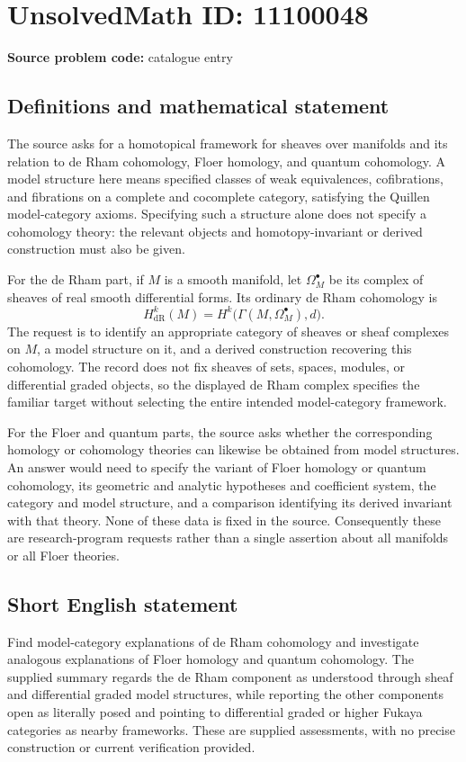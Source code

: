 \documentclass[11pt]{article}
\begin{document}
\section*{UnsolvedMath ID: 11100048}
\textbf{Source problem code:} catalogue entry
\subsection{Definitions and mathematical statement}
The source asks for a homotopical framework for sheaves over manifolds and its relation to de Rham cohomology, Floer homology, and quantum cohomology. A model structure here means specified classes of weak equivalences, cofibrations, and fibrations on a complete and cocomplete category, satisfying the Quillen model-category axioms. Specifying such a structure alone does not specify a cohomology theory: the relevant objects and homotopy-invariant or derived construction must also be given.

For the de Rham part, if $M$ is a smooth manifold, let $\Omega_M^{\bullet}$ be its complex of sheaves of real smooth differential forms. Its ordinary de Rham cohomology is
\[
 H^k_{\mathrm{dR}}(M)=H^k\bigl(\Gamma(M,\Omega_M^{\bullet}),d\bigr).
\]
The request is to identify an appropriate category of sheaves or sheaf complexes on $M$, a model structure on it, and a derived construction recovering this cohomology. The record does not fix sheaves of sets, spaces, modules, or differential graded objects, so the displayed de Rham complex specifies the familiar target without selecting the entire intended model-category framework.

For the Floer and quantum parts, the source asks whether the corresponding homology or cohomology theories can likewise be obtained from model structures. An answer would need to specify the variant of Floer homology or quantum cohomology, its geometric and analytic hypotheses and coefficient system, the category and model structure, and a comparison identifying its derived invariant with that theory. None of these data is fixed in the source. Consequently these are research-program requests rather than a single assertion about all manifolds or all Floer theories.
\subsection{Short English statement}
Find model-category explanations of de Rham cohomology and investigate analogous explanations of Floer homology and quantum cohomology. The supplied summary regards the de Rham component as understood through sheaf and differential graded model structures, while reporting the other components open as literally posed and pointing to differential graded or higher Fukaya categories as nearby frameworks. These are supplied assessments, with no precise construction or current verification provided.
\end{document}
